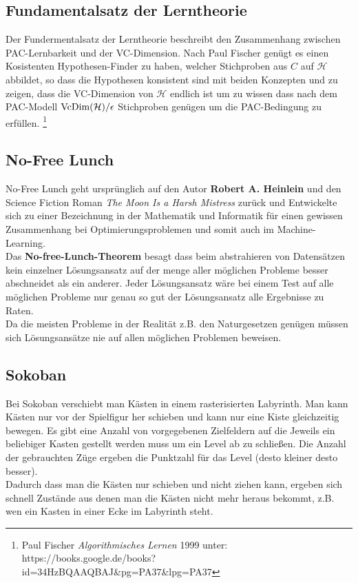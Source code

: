 \documentclass[a4paper]{article}
\begin{document}
\subsection{Fundamentalsatz der Lerntheorie}
Der Fundermentalsatz der Lerntheorie beschreibt den Zusammenhang zwischen PAC-Lernbarkeit und der VC-Dimension. Nach Paul Fischer genügt es einen Kosistenten Hypothesen-Finder zu haben, welcher Stichproben aus $C$ auf $\mathcal{H}$ abbildet, so dass die Hypothesen konsistent sind mit beiden Konzepten und zu zeigen, dass die VC-Dimension von $\mathcal{H}$ endlich ist um zu wissen dass nach dem PAC-Modell $\textnormal{VcDim}(\mathcal{H})/\epsilon$ Stichproben genügen um die PAC-Bedingung zu erfüllen. \footnote{Paul Fischer \textit{Algorithmisches Lernen} 1999 unter: https://books.google.de/books?id=34HzBQAAQBAJ\&pg=PA37\&lpg=PA37
}

\subsection{No-Free Lunch}
No-Free Lunch geht ursprünglich auf den Autor \textbf{ Robert A. Heinlein} und den Science Fiction Roman \textit{The Moon Is a Harsh Mistress } zurück und Entwickelte sich zu einer Bezeichnung in der Mathematik und Informatik für einen gewissen Zusammenhang bei Optimierungsproblemen und somit auch im Machine-Learning. \\
Das \textbf{No-free-Lunch-Theorem} besagt dass beim abstrahieren von Datensätzen kein einzelner Lösungsansatz auf der menge aller möglichen Probleme besser abschneidet als ein anderer. Jeder Lösungsansatz wäre bei einem Test auf alle möglichen Probleme nur genau so gut der Lösungsansatz alle Ergebnisse zu Raten.\\
Da die meisten Probleme in der Realität z.B. den Naturgesetzen genügen müssen sich Lösungsansätze nie auf allen möglichen Problemen beweisen.

\subsection{Sokoban}
Bei Sokoban verschiebt man Kästen in einem rasterisierten  Labyrinth. Man kann Kästen nur vor der Spielfigur her schieben und kann nur eine Kiste gleichzeitig bewegen. Es gibt eine Anzahl von vorgegebenen Zielfeldern auf die Jeweils ein beliebiger Kasten gestellt werden muss um ein Level ab zu schließen. Die Anzahl der gebrauchten Züge ergeben die Punktzahl für das Level (desto kleiner desto besser). \\
Dadurch dass man die Kästen nur schieben und nicht ziehen kann, ergeben sich schnell Zustände aus denen man die Kästen nicht mehr heraus bekommt, z.B. wen ein Kasten in einer Ecke im Labyrinth steht.
\end{document}
